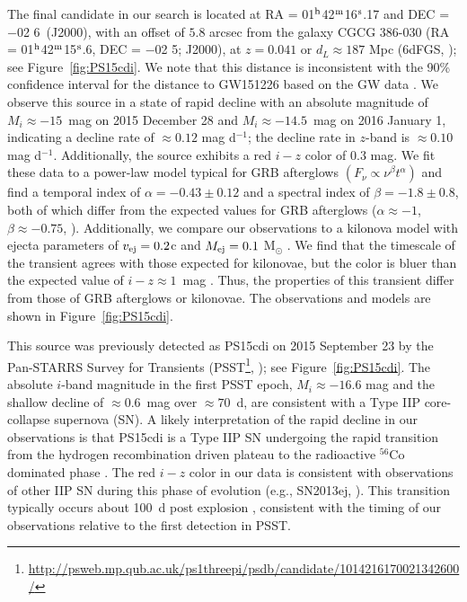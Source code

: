 The final candidate in our search is located at RA = 01$^{\rm h}$42$^{\rm m}$16$^{\rm s}$.17 
and DEC = $-$02 6\arcsec~(J2000), with an offset of $5.8$ arcsec from the galaxy 
CGCG 386-030 (RA =  01$^{\rm h}$42$^{\rm m}$15$^{\rm s}$.6, DEC = $-$02 
5\arcsec; J2000), at $z = 0.041$ or $d_L \approx 187$ Mpc (6dFGS, \citealt{jones+04,jones+09}); see 
Figure~\ref{fig:PS15cdi}. We note that this distance is inconsistent with the 90\% confidence interval for
the distance to GW151226 based on the GW data \citep{abb+16c}. We observe this source in a state of rapid decline with an 
absolute magnitude of $M_i \approx -15$~mag on 2015 December 28 and $M_i\approx -14.5$~mag on 2016 
January 1, indicating a decline rate of $\approx 0.12$ mag d$^{-1}$; the decline rate in $z$-band is 
$\approx 0.10$ mag d$^{-1}$. Additionally, the source exhibits a red $i-z$ color of $0.3$ mag. We 
fit these data to a power-law model typical for GRB afterglows $(F_\nu \propto \nu^{\beta} t^{\alpha})$ 
and find a temporal index of $\alpha = -0.43\pm0.12$ and a spectral index of $\beta = -1.8\pm0.8$, 
both of which differ from the expected values for GRB afterglows ($\alpha \approx -1$, 
$\beta \approx -0.75$, \citealt{sari+98}). Additionally, we compare our observations to a 
kilonova model with ejecta parameters of $v_{\rm ej} = 0.2$c and $M_{\rm ej} = 0.1$ M$_\odot$
 \citep{barnes13}. We find that the timescale of the transient agrees with those expected for kilonovae, 
 but the color is bluer than the expected value of $i-z \approx 1$~mag \citep{barnes13}. Thus, the properties
 of this transient differ from those of GRB afterglows or kilonovae. The observations 
 and models are shown in Figure~\ref{fig:PS15cdi}.

This source was previously detected as PS15cdi on 2015 September 23 by the Pan-STARRS 
Survey for Transients (PSST\footnote{\url{http://psweb.mp.qub.ac.uk/ps1threepi/psdb/candidate/1014216170021342600/}},
\citealt{huber+15}); see Figure~\ref{fig:PS15cdi}. The absolute $i$-band 
magnitude in the first PSST epoch, $M_i\approx -16.6$ mag and the shallow decline of $\approx0.6$~mag 
over $\approx70$~d, are consistent with a Type IIP core-collapse supernova (SN). 
A likely interpretation of the rapid decline in our observations is that PS15cdi is a Type IIP SN undergoing 
the rapid transition from the hydrogen recombination driven plateau to the radioactive $^{56}$Co dominated 
phase \citep{kasen09,dhun+16,sanders+15}. The red $i-z$ color in our data is consistent with observations 
of other IIP SN during this phase of evolution (e.g., SN2013ej, \citealt{dhun+16}).
This transition typically occurs about 100~d post explosion \citep{kasen09,dhun+16,sanders+15}, consistent with the 
timing of our observations relative to the first detection in PSST.


